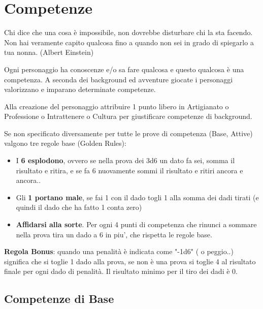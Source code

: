 \documentclass[a4paper,11pt,twoside,openany]{book}
\begin{document}

\pagebreak

\section{Competenze}

\label{competenze}
\begin{tcolorbox}[enhanced,arc=5pt,boxrule=0.3pt]{
Chi dice che una cosa è impossibile, non dovrebbe disturbare chi la sta facendo.\\
Non hai veramente capito qualcosa fino a quando non sei in grado di spiegarlo a tua nonna. (Albert Einstein)}\end{tcolorbox}\medskip


Ogni personaggio ha conoscenze e/o sa fare qualcosa e questo qualcosa è una competenza. A seconda dei background ed avventure giocate i personaggi valorizzano e imparano determinate competenze.

Alla creazione del personaggio attribuire 1 punto libero in Artigianato o Professione o Intrattenere o Cultura per giustificare competenze di background.

Se non specificato diversamente per tutte le prove di competenza (Base, Attive) valgono tre regole base  (Golden Rules):

\begin{itemize}
	\item
	      I \textbf{6 esplodono}, ovvero se nella prova dei 3d6 un dato fa sei, somma il risultato e ritira, e se fa 6 nuovamente sommi il risultato e ritiri ancora e ancora..
	\item
	      Gli \textbf{1 portano male}, se fai 1 con il dado togli 1 alla somma dei dadi tirati (e quindi il dado che ha fatto 1 conta zero)
	\item
	      \textbf{Affidarsi alla sorte}. Per ogni 4 punti di competenza che rinunci a sommare nella prova tira un dado a 6 in piu', che rispetta le regole base.
\end{itemize}

\textbf{Regola Bonus}: quando una penalità è indicata come "-1d6" ( o peggio..) significa che si toglie 1 dado alla prova, se non è una prova si toglie 4 al risultato finale per ogni dado di penalità. Il risultato minimo per il tiro dei dadi è 0.


\subsection{Competenze di Base}
\end{document}
